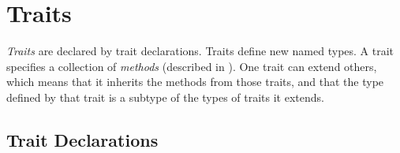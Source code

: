 %
%
%
%

\chapter{Traits}


\emph{Traits} are declared by trait declarations.
Traits define new named types.
A trait specifies a collection of \emph{methods}
(described in ).
One trait can extend others,
which means that it inherits the methods from those traits,
and that the type defined by that trait
is a subtype of the types of traits it extends.


\section{Trait Declarations}

